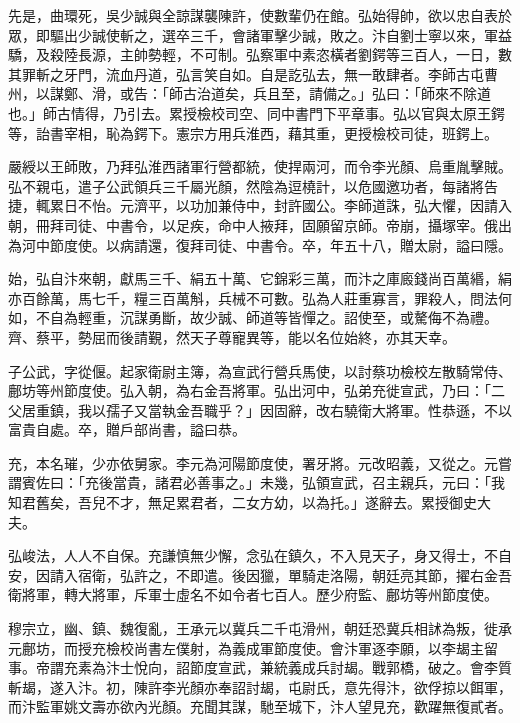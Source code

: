 \begin{pinyinscope}
 先是，曲環死，吳少誠與全諒謀襲陳許，使數輩仍在館。弘始得帥，欲以忠自表於眾，即驅出少誠使斬之，選卒三千，會諸軍擊少誠，敗之。汴自劉士寧以來，軍益驕，及殺陸長源，主帥勢輕，不可制。弘察軍中素恣橫者劉鍔等三百人，一日，數其罪斬之牙門，流血丹道，弘言笑自如。自是訖弘去，無一敢肆者。李師古屯曹州，以謀鄭、滑，或告：「師古治道矣，兵且至，請備之。」弘曰：「師來不除道也。」師古情得，乃引去。累授檢校司空、同中書門下平章事。弘以官與太原王鍔等，詒書宰相，恥為鍔下。憲宗方用兵淮西，藉其重，更授檢校司徒，班鍔上。



 嚴綬以王師敗，乃拜弘淮西諸軍行營都統，使捍兩河，而令李光顏、烏重胤擊賊。弘不親屯，遣子公武領兵三千屬光顏，然陰為逗橈計，以危國邀功者，每諸將告捷，輒累日不怡。元濟平，以功加兼侍中，封許國公。李師道誅，弘大懼，因請入朝，冊拜司徒、中書令，以足疾，命中人掖拜，固願留京師。帝崩，攝塚宰。俄出為河中節度使。以病請還，復拜司徒、中書令。卒，年五十八，贈太尉，謚曰隱。



 始，弘自汴來朝，獻馬三千、絹五十萬、它錦彩三萬，而汴之庫廄錢尚百萬緡，絹亦百餘萬，馬七千，糧三百萬斛，兵械不可數。弘為人莊重寡言，罪殺人，問法何如，不自為輕重，沉謀勇斷，故少誠、師道等皆憚之。詔使至，或驁侮不為禮。齊、蔡平，勢屈而後請覲，然天子尊寵異等，能以名位始終，亦其天幸。



 子公武，字從偃。起家衛尉主簿，為宣武行營兵馬使，以討蔡功檢校左散騎常侍、鄜坊等州節度使。弘入朝，為右金吾將軍。弘出河中，弘弟充徙宣武，乃曰：「二父居重鎮，我以孺子又當執金吾職乎？」因固辭，改右驍衛大將軍。性恭遜，不以富貴自處。卒，贈戶部尚書，謚曰恭。



 充，本名璀，少亦依舅家。李元為河陽節度使，署牙將。元改昭義，又從之。元嘗謂賓佐曰：「充後當貴，諸君必善事之。」未幾，弘領宣武，召主親兵，元曰：「我知君舊矣，吾兒不才，無足累君者，二女方幼，以為托。」遂辭去。累授御史大夫。



 弘峻法，人人不自保。充謙慎無少懈，念弘在鎮久，不入見天子，身又得士，不自安，因請入宿衛，弘許之，不即遣。後因獵，單騎走洛陽，朝廷亮其節，擢右金吾衛將軍，轉大將軍，斥軍士虛名不如令者七百人。歷少府監、鄜坊等州節度使。



 穆宗立，幽、鎮、魏復亂，王承元以冀兵二千屯滑州，朝廷恐冀兵相訹為叛，徙承元鄜坊，而授充檢校尚書左僕射，為義成軍節度使。會汴軍逐李願，以李朅主留事。帝謂充素為汴士悅向，詔節度宣武，兼統義成兵討朅。戰郭橋，破之。會李質斬朅，遂入汴。初，陳許李光顏亦奉詔討朅，屯尉氏，意先得汴，欲俘掠以餌軍，而汴監軍姚文壽亦欲內光顏。充聞其謀，馳至城下，汴人望見充，歡躍無復貳者。




\end{pinyinscope}
